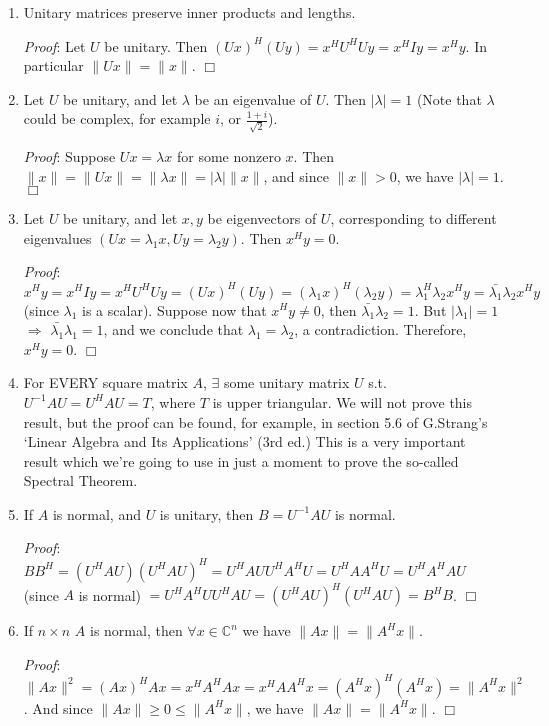\documentclass[12pt,oneside]{article}
\begin{document}
\begin{enumerate}
\item Unitary matrices preserve inner products and lengths.

\emph{Proof}: Let  $U$ be unitary. Then  $(Ux)^H (U y) = x^H U^H U y = x^H I y = x^H y$. In particular $\|Ux\| = \|x\|$. $\Box$

\item Let $U$ be unitary, and let $\lambda$ be an eigenvalue of
  $U$. Then $|\lambda| = 1$ (Note that $\lambda$ could be complex, for
  example $i$, or $\frac{1 + i}{\sqrt{2}}$).

\emph{Proof}: Suppose $Ux =  \lambda x$ for some nonzero $x$. Then $\|x\| = \|Ux\| = \|\lambda x\| = |\lambda| \|x\|$, and since $\|x\| > 0$, we have $|\lambda| =
  1$. $\Box$

\item Let $U$ be unitary, and let $x,y$ be eigenvectors of $U$,
  corresponding to different eigenvalues $(Ux = \lambda_1 x, Uy =
  \lambda_2 y)$. Then $x^H y = 0$.

\emph{Proof}: $x^H y = x^H I y = x^H U^H U
  y = (Ux)^H (Uy) = (\lambda_1 x)^H (\lambda_2 y) = \lambda_1^H
  \lambda_2 x^H y = \bar{\lambda_1} \lambda_2 x^H y$ (since
  $\lambda_1$ is a scalar). Suppose now that $x^H y \neq 0$, then
  $\bar{\lambda_1} \lambda_2 = 1$. But $|\lambda_1| = 1$
  $\Longrightarrow$ $\bar{\lambda_1} \lambda_1 = 1$, and we conclude
  that $\lambda_1 = \lambda_2$, a contradiction. Therefore, $x^H y =
  0$. $\Box$

\item For EVERY square matrix $A$, $\exists$ some unitary matrix $U$
  s.t. $U^{-1} A U = U^H A U = T$, where $T$ is upper triangular. We will not
  prove this result, but the proof can be found, for example, in
  section 5.6 of G.Strang's `Linear Algebra and Its Applications' (3rd
  ed.) This is a very important result which we're going to use in just
  a moment to prove the so-called Spectral Theorem.

\item If $A$ is normal, and $U$ is unitary, then $B = U^{-1} A U$ is
  normal.

\emph{Proof}: $B B^H = (U^H A U) (U^H A U)^H = U^H A U U^H A^H U =
  U^H A A^H U = U^H A^H A U$ (since $A$ is normal) $= U^H A^H U U^H A
  U = (U^H A U)^H (U^H A U) = B^H B$. $\Box$

\item If $n \times n$ $A$ is normal, then $\forall x \in
  \mathbb{C}^n$ we have $\|Ax\| = \|A^H x\|$.

\emph{Proof}: $\|Ax\|^2 = (Ax)^H
  Ax = x^H A^H A x = x^H A A^H x = (A^H x)^H (A^H x) = \|A^H
  x\|^2$. And since $\|Ax\| \geq 0 \leq \|A^H x\|$, we have $\|Ax\| =
  \|A^H x\|$. $\Box$


\end{enumerate}
\end{document}
